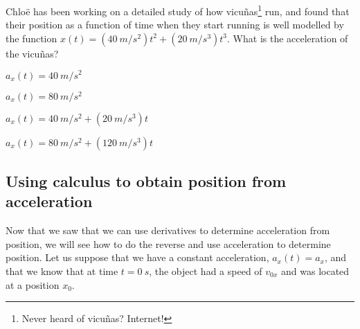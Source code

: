 \begin{checkpoint}
\begin{MCquestion}{Chlo\"e has been working on a detailed study of how vicu\~nas\footnote{Never heard of vicu\~nas? Internet!} run, and found that their position as a function of time when they start running is well modelled by the function $x(t)=(\SI{40}{m/s^2})t^2+(\SI{20}{m/s^3})t^3$. What is the acceleration of the vicu\~nas?}
\item $a_x(t)=\SI{40}{m/s^2}$
\item $a_x(t)=\SI{80}{m/s^2}$
\item $a_x(t)=\SI{40}{m/s^2}+(\SI{20}{m/s^3})t$
\item $a_x(t)=\SI{80}{m/s^2}+(\SI{120}{m/s^3})t$ \correct
\end{MCquestion}
\end{checkpoint}

\subsection{Using calculus to obtain position from acceleration}
Now that we saw that we can use derivatives to determine acceleration from position, we will see how to do the reverse and use acceleration to determine position. Let us suppose that we have a constant acceleration, $a_x(t)=a_x$, and that we know that at time $t=\SI{0}{s}$, the object had a speed of $v_{0x}$ and was located at a position $x_0$. 

